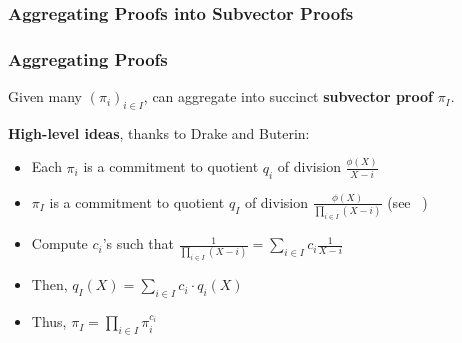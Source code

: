 \subsubsection{Aggregating Proofs into Subvector Proofs}
\begin{frame}
    \frametitle{Aggregating Proofs}
    \pause
    Given many $(\pi_i)_{i \in I}$, can aggregate into succinct \textbf{subvector proof} $\pi_I$.\pause

    \textbf{High-level ideas}, thanks to Drake and Buterin:\pause
    \begin{itemize}
        \item Each $\pi_i$ is a commitment to quotient $q_i$ of division $\frac{\phi(X)}{X-i}$\pause
        \item $\pi_I$ is a commitment to quotient $q_I$ of division $\frac{\phi(X)}{\prod_{i\in I} (X-i)}$ (see ~\cite{KZG10a})\pause
        \item Compute $c_i$'s such that $\frac{1}{\prod_{i\in I}(X-i)} = \sum_{i\in I} c_i \frac{1}{X-i}$\pause
        \item Then, $q_I(X) = \sum_{i\in I} c_i \cdot q_i(X)$\pause
        \item Thus, $\pi_I = \prod_{i\in I} \pi_i^{c_i}$
    \end{itemize}
\end{frame}
